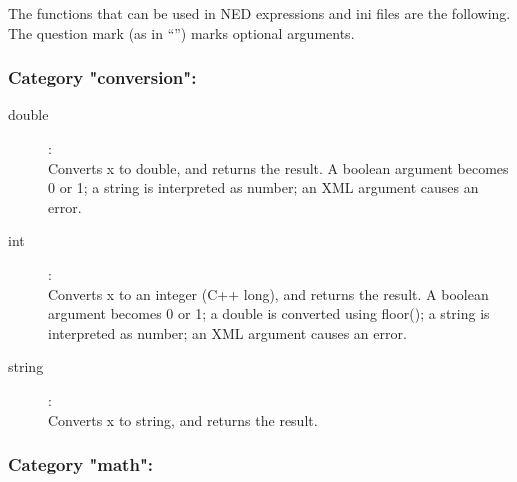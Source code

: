 \label{cha:ned-functions}

The functions that can be used in NED expressions and ini files are the
following. The question mark (as in ``'') marks optional arguments.

%
%

\subsubsection{Category "conversion":}

\begin{description}
\item[double]:  \\
    Converts x to double, and returns the result. A boolean argument becomes 0 or 1; a string is interpreted as number; an XML argument causes an error.
\item[int]:  \\
    Converts x to an integer (C++ long), and returns the result. A boolean argument becomes 0 or 1; a double is converted using floor(); a string is interpreted as number; an XML argument causes an error.
\item[string]:  \\
    Converts x to string, and returns the result.

\end{description}

\subsubsection{Category "math":}

